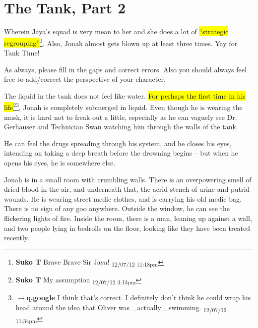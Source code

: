 \setcounter{chapter}{ 11 }
\chapter{\textbf{The Tank, Part 2} }



\subChapterTitle{}





Wherein Jaya's squad is very mean to her and she does a lot of \hl{``strategic regrouping''}\footnote{\textbf{Suko T }Brave Brave Sir Jaya! \textsubscript{12/07/12 11:18pm}}.  Also, Jonah almost gets blown up at least three times.  Yay for Tank Time!



As always, please fill in the gaps and correct errors.  Also you should always feel free to add/correct the perspective of your character.





The liquid in the tank does not feel like water. \hl{For perhaps the first time in his life}\footnote{\textbf{Suko T }My assumption \textsubscript{12/07/12 3:13pm}}\footnote{$\rightarrow$\textbf{q.google }I think that's correct.  I definitely don't think he could wrap his head around the idea that Oliver was \_actually\_ swimming. \textsubscript{12/07/12 11:34pm}}, Jonah is completely submerged in liquid.  Even though he is wearing the mask, it is hard not to freak out a little, especially as he can vaguely see Dr. Gerhauser and Technician Swan watching him through the walls of the tank.  



He can feel the drugs spreading through his system, and he closes his eyes, intending on taking a deep breath before the drowning begins -- but when he opens his eyes, he is somewhere else.  



Jonah is in a small room with crumbling walls.  There is an overpowering smell of dried blood in the air, and underneath that, the acrid stench of urine and putrid wounds.  He is wearing street medic clothes, and is carrying his old medic bag.  There is no sign of any goo anywhere.  Outside the window, he can see the flickering lights of fire.  Inside the room, there is a man, leaning up against a wall, and two people lying in bedrolls on the floor, looking like they have been treated recently.



